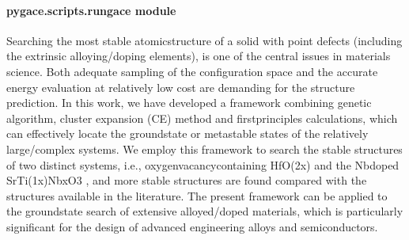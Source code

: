 \documentclass[letterpaper,10pt,english]{sphinxmanual}
\begin{document}
\paragraph{pygace.scripts.rungace module}
\label{\detokenize{pygace.scripts:module-pygace.scripts.rungace}}\label{\detokenize{pygace.scripts:pygace-scripts-rungace-module}}
\sphinxAtStartPar
Searching the most stable atomic\sphinxhyphen{}structure of a solid with point defects
(including the extrinsic alloying/doping elements), is one of the central issues in
materials science. Both adequate sampling of the configuration space and the
accurate energy evaluation at relatively low cost are demanding for the structure
prediction. In this work, we have developed a framework combining genetic
algorithm, cluster expansion (CE) method and first\sphinxhyphen{}principles calculations, which
can effectively locate the ground\sphinxhyphen{}state or meta\sphinxhyphen{}stable states of the relatively
large/complex systems. We employ this framework to search the stable structures
of two distinct systems, i.e., oxygen\sphinxhyphen{}vacancy\sphinxhyphen{}containing HfO(2\sphinxhyphen{}x) and the
Nb\sphinxhyphen{}doped SrTi(1\sphinxhyphen{}x)NbxO3 , and more stable structures are found compared with
the structures available in the literature. The present framework can be applied
to the ground\sphinxhyphen{}state search of extensive alloyed/doped materials, which is
particularly significant for the design of advanced engineering alloys and
semiconductors.
\end{document}
